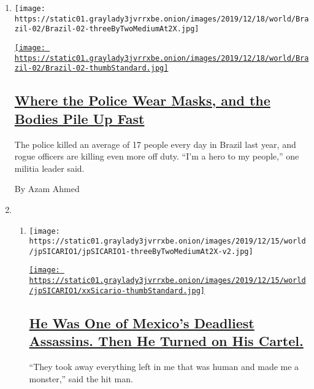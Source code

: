 \begin{enumerate}
\def\labelenumi{\arabic{enumi}.}
\item
  \texttt{[image: https://static01.graylady3jvrrxbe.onion/images/2019/12/18/world/Brazil-02/Brazil-02-threeByTwoMediumAt2X.jpg]}

  \href{/2019/12/20/world/americas/brazil-police-shootings-murder.html}{\texttt{[image: https://static01.graylady3jvrrxbe.onion/images/2019/12/18/world/Brazil-02/Brazil-02-thumbStandard.jpg]}}

  \hypertarget{where-the-police-wear-masks-and-the-bodies-pile-up-fast}{%
  \subsection{\texorpdfstring{\href{/2019/12/20/world/americas/brazil-police-shootings-murder.html}{Where
  the Police Wear Masks, and the Bodies Pile Up
  Fast}}{Where the Police Wear Masks, and the Bodies Pile Up Fast}}\label{where-the-police-wear-masks-and-the-bodies-pile-up-fast}}

  The police killed an average of 17 people every day in Brazil last
  year, and rogue officers are killing even more off duty. ``I'm a hero
  to my people,'' one militia leader said.

  By Azam Ahmed
\item
  \begin{enumerate}
  \def\labelenumii{\arabic{enumii}.}
  \item
    \texttt{[image: https://static01.graylady3jvrrxbe.onion/images/2019/12/15/world/jpSICARIO1/jpSICARIO1-threeByTwoMediumAt2X-v2.jpg]}

    \href{/2019/12/14/world/americas/sicario-mexico-drug-cartels.html}{\texttt{[image: https://static01.graylady3jvrrxbe.onion/images/2019/12/15/world/jpSICARIO1/xxSicario-thumbStandard.jpg]}}

    \hypertarget{he-was-one-of-mexicos-deadliest-assassins-then-he-turned-on-his-cartel}{%
    \subsection{\texorpdfstring{\href{/2019/12/14/world/americas/sicario-mexico-drug-cartels.html}{He
    Was One of Mexico's Deadliest Assassins. Then He Turned on His
    Cartel.}}{He Was One of Mexico's Deadliest Assassins. Then He Turned on His Cartel.}}\label{he-was-one-of-mexicos-deadliest-assassins-then-he-turned-on-his-cartel}}

    ``They took away everything left in me that was human and made me a
    monster,'' said the hit man.


\end{enumerate}
\end{enumerate}
